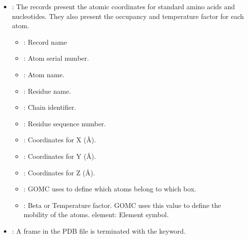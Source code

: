 \documentclass[letterpaper,10pt,english]{sphinxmanual}
\begin{document}
\begin{itemize}
\begin{itemize}
\end{itemize}

\item {} 
\sphinxAtStartPar
{}:
The  records present the atomic coordinates for standard amino acids
and nucleotides. They also present the occupancy and temperature factor for each atom.
\begin{itemize}
\item {} 
\sphinxAtStartPar
{}: Record name

\item {} 
\sphinxAtStartPar
{}: Atom serial number.

\item {} 
\sphinxAtStartPar
{}: Atom name.

\item {} 
\sphinxAtStartPar
{}: Residue name.

\item {} 
\sphinxAtStartPar
{}: Chain identifier.

\item {} 
\sphinxAtStartPar
{}: Residue sequence number.

\item {} 
\sphinxAtStartPar
{}: Coordinates for X (Å).

\item {} 
\sphinxAtStartPar
{}: Coordinates for Y (Å).

\item {} 
\sphinxAtStartPar
{}: Coordinates for Z (Å).

\item {} 
\sphinxAtStartPar
{}: GOMC uses to define which atoms belong to which box.

\item {} 
\sphinxAtStartPar
{}: Beta or Temperature factor. GOMC uses this value to define the mobility of the atoms. element: Element symbol.

\end{itemize}

\item {} 
\sphinxAtStartPar
{}:
A frame in the PDB file is terminated with the keyword.

\end{itemize}
\end{document}
